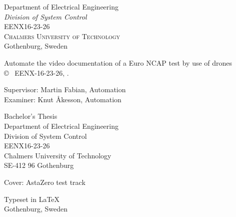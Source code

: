 \begin{center}
\begin{figure}[H]
    \fi
	\end{figure}	\vspace{5mm}	
	
	Department of Electrical Engineering \\
	\emph{Division of System Control}\\
	EENX16-23-26\\
	\textsc{Chalmers University of Technology} \\
	Gothenburg, Sweden \the\year \\
\end{center}


\newpage
\thispagestyle{plain}

Automate the video documentation of a Euro
NCAP test by use of drones\\
\copyright ~ EENX-16-23-26, \the\year. \setlength{\parskip}{1cm}

Supervisor: Martin Fabian, Automation\\
Examiner: Knut Åkesson, Automation \setlength{\parskip}{1cm}

Bachelor's Thesis \the\year\\	
Department of Electrical Engineering\\
Division of System Control\\
EENX16-23-26\\
Chalmers University of Technology\\
SE-412 96 Gothenburg\\ \setlength{\parskip}{0.5cm}

\vfill
Cover: AstaZero test track 
~\cite{AboutAstaZero}

Typeset in \LaTeX \tagtemp\\
Gothenburg, Sweden \the\year
